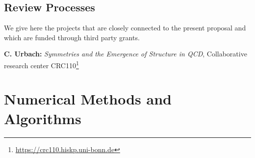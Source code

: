 \documentclass [a4paper, 11pt]{article}
\begin{document}

%


\subsection{Review Processes}

We give here the projects that are closely connected to the present
proposal and which are funded through third party grants.


\textbf{C. Urbach:} \textit{Symmetries and the Emergence of Structure
	in QCD}, Collaborative research center
CRC110\footnote{\protect\url{https://crc110.hiskp.uni-bonn.de}}

\section{Numerical Methods and Algorithms} 



\end{document}
